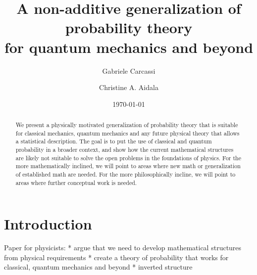 \documentclass[10pt,twocolumn, nofootinbib]{revtex4-2}
\begin{document}
\title{A non-additive generalization of probability theory \\for quantum mechanics and beyond}
\author{Gabriele Carcassi}
\author{Christine A. Aidala}

\date{\today}


\begin{abstract}
	We present a physically motivated generalization of probability theory that is suitable for classical mechanics, quantum mechanics and any future physical theory that allows a statistical description. The goal is to put the use of classical and quantum probability in a broader context, and show how the current mathematical structures are likely not suitable to solve the open problems in the foundations of physics. For the more mathematically inclined, we will point to areas where new math or generalization of established math are needed. For the more philosophically incline, we will point to areas where further conceptual work is needed.
	
	
\end{abstract}

\maketitle


\section{Introduction}
Paper for physicists:
* argue that we need to develop mathematical structures from physical requirements
* create a theory of probability that works for classical, quantum mechanics and beyond
* inverted structure
\end{document}
